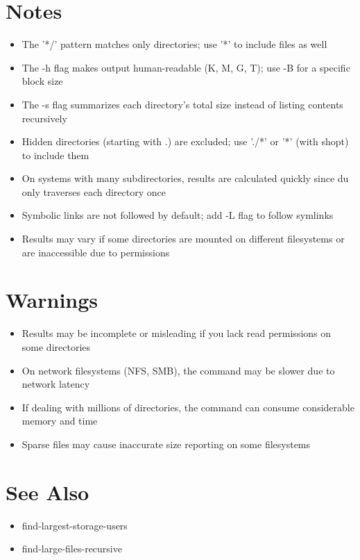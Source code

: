 \documentclass[openany]{book}
\begin{document}
\section*{Notes}
\begin{itemize}
  \item The '*/' pattern matches only directories; use '*' to include files as well
  \item The -h flag makes output human-readable (K, M, G, T); use -B for a specific block size
  \item The -s flag summarizes each directory's total size instead of listing contents recursively
  \item Hidden directories (starting with .) are excluded; use './*' or '*' (with shopt) to include them
  \item On systems with many subdirectories, results are calculated quickly since du only traverses each directory once
  \item Symbolic links are not followed by default; add -L flag to follow symlinks
  \item Results may vary if some directories are mounted on different filesystems or are inaccessible due to permissions
\end{itemize}

\section*{Warnings}
\begin{itemize}
  \item Results may be incomplete or misleading if you lack read permissions on some directories
  \item On network filesystems (NFS, SMB), the command may be slower due to network latency
  \item If dealing with millions of directories, the command can consume considerable memory and time
  \item Sparse files may cause inaccurate size reporting on some filesystems
\end{itemize}

\section*{See Also}
\begin{itemize}
  \item find-largest-storage-users
  \item find-large-files-recursive
\end{itemize}
\end{document}
